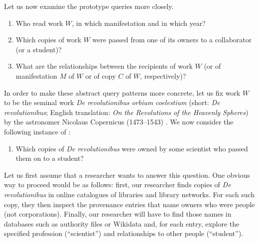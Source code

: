 Let us now examine the prototype queries more closely.
%
\begin{enumerate}
  \item[\exaquery{1}]
    Who read work $W$, in which manifestation and in which year?
  \item[\exaquery{2}]
    Which copies of work $W$ were passed from one of its owners to a collaborator (or a student)?
  \item[\exaquery{3}]
    What are the relationships between the recipients of work $W$
    (or of manifestation $M$ of $W$ or of copy $C$ of $W$, respectively)?
\end{enumerate}
%
In order to make these abstract query patterns more concrete, let us fix work $W$ to be the seminal work \emph{De revolutionibus orbium coelestium}
(short: \emph{De revolutionibus}; English translation: \emph{On the Revolutions of the Heavenly Spheres}) by the astronomer Nicolaus Copernicus (1473–1543) \autocite{Kopernikus1543}.
We now consider the following instance of :
%
\begin{enumerate}
  \item[\exaquery{2$'$}]
    Which copies of \emph{De revolutionibus} were owned by some scientist who passed them on to a student?
\end{enumerate}
%
Let us first assume that a researcher wants to answer this question.
One obvious way to proceed would be as follows: first, our researcher finds copies of \emph{De revolutionibus} 
in online catalogues of libraries and library networks. For each such copy, they then inspect the provenance entries
that name owners who were people (not corporations). Finally, our researcher will have to find those names in databases such as
authority files or Wikidata and, for each entry, explore the specified profession (\enquote{scientist})
and relationships to other people (\enquote{student}).

